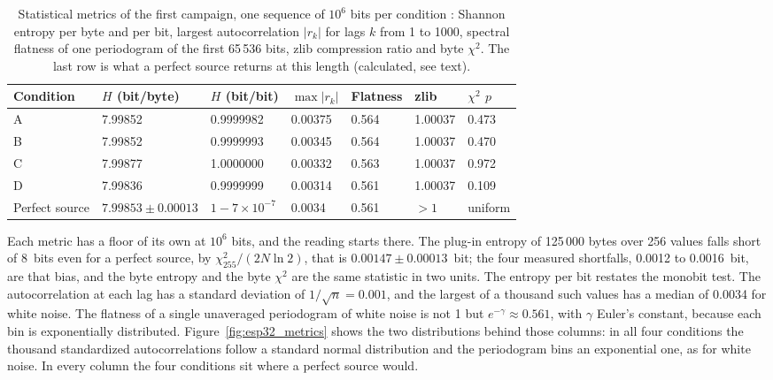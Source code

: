 \begin{table}[htbp]
\centering
\caption{Statistical metrics of the first campaign, one sequence of
$10^6$ bits per condition \meas{}: Shannon entropy per byte and per bit,
largest autocorrelation $|r_k|$ for lags $k$ from 1 to 1000, spectral
flatness of one periodogram of the first 65\,536 bits, zlib compression
ratio and byte $\chi^2$. The last row is what a perfect source returns at
this length (calculated, see text).}
\label{tab:esp32_entropy}
\footnotesize
\begin{tabular}{@{}lllllll@{}}
\toprule
Condition & $H$ (bit/byte) & $H$ (bit/bit) & $\max|r_k|$ & Flatness & zlib & $\chi^2$ $p$ \\
\midrule
A & 7.99852 & 0.9999982 & 0.00375 & 0.564 & 1.00037 & 0.473 \\
B & 7.99852 & 0.9999993 & 0.00345 & 0.564 & 1.00037 & 0.470 \\
C & 7.99877 & 1.0000000 & 0.00332 & 0.563 & 1.00037 & 0.972 \\
D & 7.99836 & 0.9999999 & 0.00314 & 0.561 & 1.00037 & 0.109 \\
\midrule
Perfect source & $7.99853 \pm 0.00013$ & $1 - 7\times10^{-7}$ & 0.0034 & 0.561 & $>1$ & uniform \\
\bottomrule
\end{tabular}
\end{table}

Each metric has a floor of its own at $10^6$ bits, and the reading starts
there. The plug-in entropy of 125\,000 bytes over 256 values falls short
of 8~bits even for a perfect source, by $\chi^2_{255}/(2N\ln 2)$, that is
$0.00147 \pm 0.00013$~bit; the four measured shortfalls, 0.0012 to
0.0016~bit, are that bias, and the byte entropy and the byte $\chi^2$ are
the same statistic in two units. The entropy per bit restates the monobit
test. The autocorrelation at each lag has a standard deviation of
$1/\sqrt{n} = 0.001$, and the largest of a thousand such values has a
median of 0.0034 for white noise. The flatness of a single unaveraged
periodogram of white noise is not 1 but $e^{-\gamma} \approx 0.561$, with
$\gamma$ Euler's constant, because each bin is exponentially distributed.
Figure~\ref{fig:esp32_metrics} shows the two distributions behind those
columns: in all four conditions the thousand standardized
autocorrelations follow a standard normal distribution and the
periodogram bins an exponential one, as for white noise.
In every column the four conditions sit where a perfect source would.

